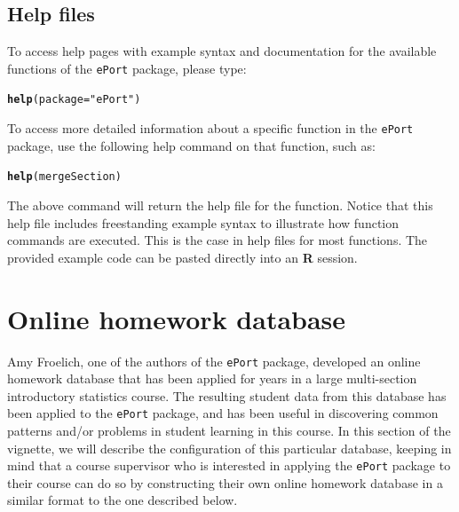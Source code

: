 \documentclass[11pt,a4paper,oldfontcommands,openany]{memoir}
\makeatletter
\newcommand{\hlstr}[1]{\textcolor[rgb]{0.192,0.494,0.8}{#1}}%
\newcommand{\hlstd}[1]{\textcolor[rgb]{0.345,0.345,0.345}{#1}}%
\newcommand{\hlkwc}[1]{\textcolor[rgb]{0.333,0.667,0.333}{#1}}%
\newcommand{\hlkwd}[1]{\textcolor[rgb]{0.737,0.353,0.396}{\textbf{#1}}}%
\newenvironment{kframe}{%
 \def\at@end@of@kframe{}%
 \ifinner\ifhmode%
  \def\at@end@of@kframe{\end{minipage}}%
  \begin{minipage}{\columnwidth}%
 \fi\fi%
 \def\FrameCommand##1{\hskip\@totalleftmargin \hskip-\fboxsep
 \colorbox{shadecolor}{##1}\hskip-\fboxsep
     \hskip-\linewidth \hskip-\@totalleftmargin \hskip\columnwidth}%
 \MakeFramed {\advance\hsize-\width
   \@totalleftmargin\z@ \linewidth\hsize
   \@setminipage}}%
 {\par\unskip\endMakeFramed%
 \at@end@of@kframe}
\newenvironment{knitrout}{}{} %
\numberwithin{equation}{section} %
\newcommand{\pkg}[1]{{\texttt{#1}}}
\makeatother
\begin{document}
\section{Help files}
\label{sec:helpSection}

To access help pages with example syntax and documentation for the available functions of the \pkg{ePort} package, please type: \\

\begin{knitrout}
\color{fgcolor}\begin{kframe}
\begin{alltt}
\hlkwd{help}\hlstd{(}\hlkwc{package}\hlstd{=}\hlstr{"ePort"}\hlstd{)}
\end{alltt}
\end{kframe}
\end{knitrout}

To access more detailed information about a specific function in the \pkg{ePort} package, use the following help command on that function, such as: \\

\begin{knitrout}
\color{fgcolor}\begin{kframe}
\begin{alltt}
\hlkwd{help}\hlstd{(mergeSection)}
\end{alltt}
\end{kframe}
\end{knitrout}

The above command will return the help file for the function. Notice that this help file includes freestanding example syntax to illustrate how function commands are executed. This is the case in help files for most functions. The provided example code can be pasted directly into an \textbf{\textsf{R}} session.

\chapter{Online homework database}
\label{sec:OnlineHomework}

Amy Froelich, one of the authors of the \texttt{ePort} package, developed an online homework database that has been applied for years in a large multi-section introductory statistics course. The resulting student data from this database has been applied to the \texttt{ePort} package, and has been useful in discovering common patterns and/or problems in student learning in this course. In this section of the vignette, we will describe the configuration of this particular database, keeping in mind that a course supervisor who is interested in applying the \texttt{ePort} package to their course can do so by constructing their own online homework database in a similar format to the one described below.
\end{document}

